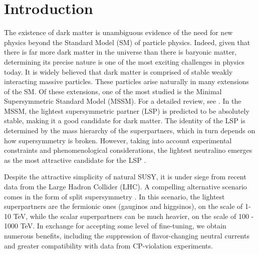 \section{Introduction}

The existence of dark matter is unambiguous evidence of the need for new physics beyond the Standard Model (SM) of particle physics. Indeed, given that there is far more dark matter in the universe than there is baryonic matter, determining its precise nature is one of the most exciting challenges in physics today. It is widely believed that dark matter is comprised of stable weakly interacting massive particles. These particles arise naturally in many extensions of the SM. Of these extensions, one of the most studied is the Minimal Supersymmetric Standard Model (MSSM). For a detailed review, see \citep{Martin1997}. In the MSSM, the lightest supersymmetric partner (LSP) is predicted to be absolutely stable, making it a good candidate for dark matter. The identity of the LSP is determined by the mass hierarchy of the superpartners, which in turn depends on how supersymmetry is broken. However, taking into account experimental constraints and phenomenological considerations, the lightest neutralino emerges as the most attractive candidate for the LSP \citep{Bertone2005a}. 

Despite the attractive simplicity of natural SUSY, it is under siege from recent  data from the Large Hadron Collider (LHC). A compelling alternative scenario comes in the form of split supersymmetry  \citep{Wells:2003tf, Dimopoulos2004, Giudice2005}. In this scenario, the lightest superpartners are the fermionic ones (gauginos and higgsinos), on the scale of 1-10 TeV, while the scalar superpartners can be much heavier, on the scale of 100 - 1000 TeV. In exchange for accepting some level of fine-tuning, we obtain numerous benefits, including the suppression of flavor-changing neutral currents and greater compatibility with data from CP-violation experiments.


